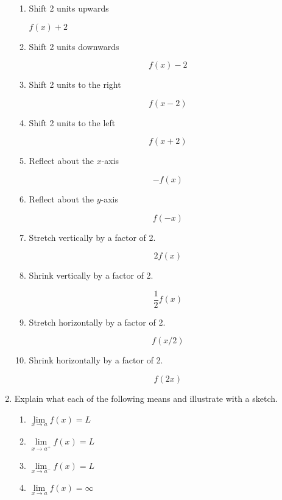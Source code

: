 \documentclass{article}
\begin{document}
\begin{enumerate}
		\begin{enumerate}
			\item Shift 2 units upwards

				$f(x) + 2$

			\item Shift 2 units downwards

				$$f(x) - 2$$

			\item Shift 2 units to the right

				$$f(x - 2)$$

			\item Shift 2 units to the left

				$$f(x + 2)$$

			\item Reflect about the $x$-axis

				$$-f(x)$$

			\item Reflect about the $y$-axis

				$$f(-x)$$

			\item Stretch vertically by a factor of 2.

				$$2f(x)$$

			\item Shrink vertically by a factor of 2.

				$$\frac{1}{2}f(x)$$

			\item Stretch horizontally by a factor of 2.

				$$f(x/2)$$

			\item Shrink horizontally by a factor of 2.

				$$f(2x)$$
		\end{enumerate}

		\item Explain what each of the following means and illustrate with
			a sketch.

		\begin{enumerate}
			\item $\lim \limits _{x \to a} f(x) = L$

			\item $\lim \limits _{x \to a^{+}} f(x) = L$

			\item $\lim \limits _{x \to a^{-}} f(x) = L$

			\item $\lim \limits _{x \to a} f(x) = \infty$


\end{enumerate}
\end{enumerate}
\end{document}
